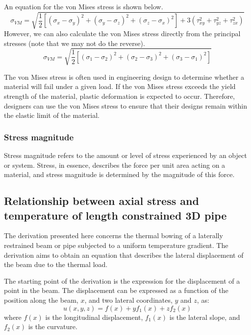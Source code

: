 An equation for the von Mises stress is shown below.
\begin{equation}
    \sigma_{VM} = \sqrt{\frac{1}{2}\left[\left(\sigma_{x}-\sigma_y\right)^2 + \left(\sigma_y - \sigma_z\right)^2+\left(\sigma_z - \sigma_x\right)^2\right] + 3\left(\tau^2_{xy} + \tau^2_{yz}+\tau_{zx}^2\right)}
\end{equation}
However, we can also calculate the von Mises stress directly from the principal stresses (note that we may not do the reverse).
\begin{equation}
    \sigma_{VM} = \sqrt{\frac{1}{2}\left[\left(\sigma_1 - \sigma_2\right)^2 +\left(\sigma_2 - \sigma_3\right)^2 + \left(\sigma_3 - \sigma_1\right)^2 \right]}
\end{equation}

The von Mises stress is often used in engineering design to determine whether a material will fail under a given load. If the von Mises stress exceeds the yield strength of the material, plastic deformation is expected to occur. Therefore, designers can use the von Mises stress to ensure that their designs remain within the elastic limit of the material.
\subsubsection{Stress magnitude}
Stress magnitude refers to the amount or level of stress experienced by an object or system. Stress, in essence, describes the force per unit area acting on a material, and stress magnitude is determined by the magnitude of this force.
\subsection{Relationship between axial stress and temperature of length constrained 3D pipe}\label{part1b}
The derivation presented here concerns the thermal bowing of a laterally restrained beam or pipe subjected to a uniform temperature gradient. The derivation aims to obtain an equation that describes the lateral displacement of the beam due to the thermal load.

The starting point of the derivation is the expression for the displacement of a point in the beam. The displacement can be expressed as a function of the position along the beam, $x$, and two lateral coordinates, $y$ and $z$, as:
\begin{equation}
    u(x,y,z) = f(x) + yf_1(x) + zf_2(x)
\end{equation}
where $f(x)$ is the longitudinal displacement, $f_1(x)$ is the lateral slope, and $f_2(x)$ is the curvature.

